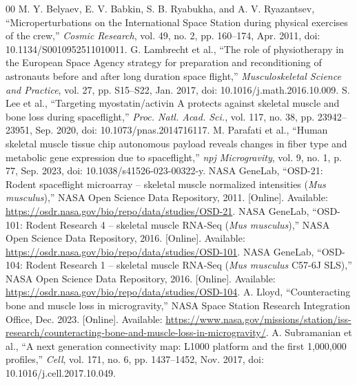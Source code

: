 \documentclass[conference]{IEEEtran}
\begin{document}
\begin{thebibliography}{00}
 M. Y. Belyaev, E. V. Babkin, S. B. Ryabukha, and A. V. Ryazantsev, ``Microperturbations on the International Space Station during physical exercises of the crew,'' \textit{Cosmic Research}, vol. 49, no. 2, pp. 160--174, Apr. 2011, doi: 10.1134/S0010952511010011.
 G. Lambrecht et al., ``The role of physiotherapy in the European Space Agency strategy for preparation and reconditioning of astronauts before and after long duration space flight,'' \textit{Musculoskeletal Science and Practice}, vol. 27, pp. S15--S22, Jan. 2017, doi: 10.1016/j.math.2016.10.009.
 S. Lee et al., ``Targeting myostatin/activin A protects against skeletal muscle and bone loss during spaceflight,'' \textit{Proc. Natl. Acad. Sci.}, vol. 117, no. 38, pp. 23942--23951, Sep. 2020, doi: 10.1073/pnas.2014716117.
 M. Parafati et al., ``Human skeletal muscle tissue chip autonomous payload reveals changes in fiber type and metabolic gene expression due to spaceflight,'' \textit{npj Microgravity}, vol. 9, no. 1, p. 77, Sep. 2023, doi: 10.1038/s41526-023-00322-y.
 NASA GeneLab, ``OSD-21: Rodent spaceflight microarray -- skeletal muscle normalized intensities (\textit{Mus musculus}),'' NASA Open Science Data Repository, 2011. [Online]. Available: \url{https://osdr.nasa.gov/bio/repo/data/studies/OSD-21}.
 NASA GeneLab, ``OSD-101: Rodent Research 4 -- skeletal muscle RNA-Seq (\textit{Mus musculus}),'' NASA Open Science Data Repository, 2016. [Online]. Available: \url{https://osdr.nasa.gov/bio/repo/data/studies/OSD-101}.
 NASA GeneLab, ``OSD-104: Rodent Research 1 -- skeletal muscle RNA-Seq (\textit{Mus musculus} C57-6J SLS),'' NASA Open Science Data Repository, 2016. [Online]. Available: \url{https://osdr.nasa.gov/bio/repo/data/studies/OSD-104}.
 A. Lloyd, ``Counteracting bone and muscle loss in microgravity,'' NASA Space Station Research Integration Office, Dec. 2023. [Online]. Available: \url{https://www.nasa.gov/missions/station/iss-research/counteracting-bone-and-muscle-loss-in-microgravity/}.
 A. Subramanian et al., ``A next generation connectivity map: L1000 platform and the first 1,000,000 profiles,'' \textit{Cell}, vol. 171, no. 6, pp. 1437--1452, Nov. 2017, doi: 10.1016/j.cell.2017.10.049.
\end{thebibliography}
\end{document}
